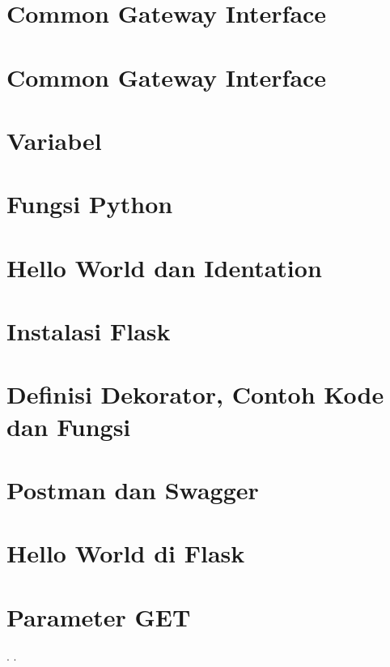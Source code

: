 \documentclass{wileySix}
\begin{document}
\chapter[Pemanggilan Modul]
{Common Gateway Interface}


\chapter[Instalasi PIP]
{Common Gateway Interface}


\chapter[Variabel]
{Variabel}




\chapter[Fungsi Python]
{Fungsi Python}


\chapter[Hello World Python dan Identation]
{Hello World dan Identation}





\chapter[Instalasi Flask]
{Instalasi Flask}


\chapter[Definisi Dekorator, Contoh Kode dan Fungsi]
{Definisi Dekorator, Contoh Kode dan Fungsi}


\chapter[Postman dan Swagger]
{Postman dan Swagger}



\chapter[Hello World di Flask]
{Hello World di Flask}



\chapter[GET]
{Parameter GET}







.
.

\printindex
\end{document}
